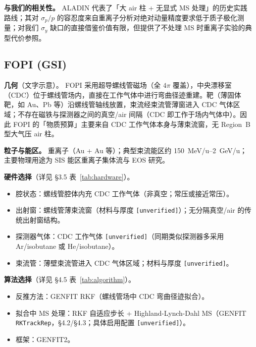 \documentclass[a4paper, 11pt]{article}
\begin{document}
\textbf{与我们的相关性。}
ALADIN 代表了「大 air 柱 + 无显式 MS 处理」的历史实践路线；其对 $\sigma_p/p$ 的容忍度来自重离子分析对绝对动量精度要求低于质子极化测量；对我们 $\sigma_y$ 缺口的直接借鉴价值有限，但提供了不处理 MS 时重离子实验的典型代价参照。

\subsection{FOPI (GSI)}
\label{sec:card_fopi}

\textbf{几何}（文字示意）。
FOPI 采用超导螺线管磁场（全 $4\pi$ 覆盖），中央漂移室（CDC）位于螺线管场内，直接在工作气体中进行弯曲径迹重建。靶（薄固体靶，如 Au、Pb 等）沿螺线管轴线放置，束流经束流管薄窗进入 CDC 气体区域；不存在磁铁与探测器之间的真空/air 间隔（CDC 即工作于场内气体中）。因此 FOPI 的「物质预算」主要来自 CDC 工作气体本身与薄束流窗，无 Region~B 型大气压 air 柱。

\textbf{粒子与能区。}
重离子（Au + Au 等）；典型束流能区约 150~MeV/u--2~GeV/u；主要物理用途为 SIS 能区重离子集体流与 EOS 研究。

\textbf{硬件选择}（详见 §3.5 表~\ref{tab:hardware}）。
\begin{itemize}[leftmargin=2em,itemsep=0pt]
\item 腔状态：螺线管腔体内充 CDC 工作气体（非真空；常压或接近常压）。
\item 出射窗：螺线管薄束流窗（材料与厚度 \texttt{[unverified]}）；无分隔真空/air 的传统出射窗结构。
\item 探测器气体：CDC 工作气体 \texttt{[unverified]}（同期类似探测器多采用 Ar/isobutane 或 He/isobutane）。
\item 束流管：薄壁束流管进入 CDC 气体区域；材料与厚度 \texttt{[unverified]}。
\end{itemize}

\textbf{算法选择}（详见 §4.5 表~\ref{tab:algorithm}）。
\begin{itemize}[leftmargin=2em,itemsep=0pt]
\item 反推方法：GENFIT RKF（螺线管场中 CDC 弯曲径迹拟合）。
\item 拟合中 MS 处理：RKF 自适应步长 + Highland-Lynch-Dahl MS（GENFIT \texttt{RKTrackRep}，§4.2/§4.3；具体启用配置 \texttt{[unverified]}）。
\item 框架：GENFIT2。
\end{itemize}
\end{document}
